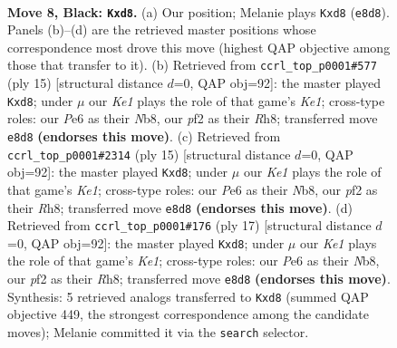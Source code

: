 \documentclass[11pt]{article}
\begin{document}
\begin{figure}[p]\centering
\begin{subfigure}{0.46\textwidth}\centering
\resizebox{\linewidth}{!}{%
\newchessgame
\chessboard[
  setfen={rnbQk2r/1p3ppp/p3pn2/2b5/2B5/4PN2/PP3PPP/RNB2RK1 b kq - 0 8},
  showmover=false,
  pgfstyle=straightmove, color=movearrow, markmove={e8-d8}
]}
\caption{}
\end{subfigure}\hfill
\begin{subfigure}{0.46\textwidth}\centering
\resizebox{\linewidth}{!}{%
\newchessgame
\chessboard[
  setfen={rnbQk2r/1p3ppp/p3pn2/2b5/2B5/4PN2/PP3PPP/RNB2RK1 b kq - 0 8},
  showmover=false,
  pgfstyle=straightmove, color=movearrow, markmove={e8-d8}
]}
\caption{}
\end{subfigure}
\\[4pt]
\begin{subfigure}{0.46\textwidth}\centering
\resizebox{\linewidth}{!}{%
\newchessgame
\chessboard[
  setfen={rnbQk2r/1p3ppp/p3pn2/2b5/2B5/4PN2/PP3PPP/RNB2RK1 b kq - 0 8},
  showmover=false,
  pgfstyle=straightmove, color=movearrow, markmove={e8-d8}
]}
\caption{}
\end{subfigure}\hfill
\begin{subfigure}{0.46\textwidth}\centering
\resizebox{\linewidth}{!}{%
\newchessgame
\chessboard[
  setfen={rnbQk2r/1p3ppp/p3pn2/2b5/2B5/4PN2/PP3PPP/RNB2RK1 b kq - 0 9},
  showmover=false,
  pgfstyle=straightmove, color=movearrow, markmove={e8-d8}
]}
\caption{}
\end{subfigure}
\caption{\textbf{Move 8, Black: \texttt{Kxd8}.} (a) Our position; Melanie plays \texttt{Kxd8} (\texttt{e8d8}). Panels (b)--(d) are the retrieved master positions whose correspondence most drove this move (highest QAP objective among those that transfer to it). (b) Retrieved from \texttt{ccrl\_top\_p0001\#577} (ply 15) [structural distance $d$=0, QAP obj=92]: the master played \texttt{Kxd8}; under $\mu$ our \emph{Ke1} plays the role of that game's \emph{Ke1}; cross-type roles: our \emph{P}e6 as their \emph{N}b8, our \emph{p}f2 as their \emph{R}h8; transferred move \texttt{e8d8} \textbf{(endorses this move)}. (c) Retrieved from \texttt{ccrl\_top\_p0001\#2314} (ply 15) [structural distance $d$=0, QAP obj=92]: the master played \texttt{Kxd8}; under $\mu$ our \emph{Ke1} plays the role of that game's \emph{Ke1}; cross-type roles: our \emph{P}e6 as their \emph{N}b8, our \emph{p}f2 as their \emph{R}h8; transferred move \texttt{e8d8} \textbf{(endorses this move)}. (d) Retrieved from \texttt{ccrl\_top\_p0001\#176} (ply 17) [structural distance $d$=0, QAP obj=92]: the master played \texttt{Kxd8}; under $\mu$ our \emph{Ke1} plays the role of that game's \emph{Ke1}; cross-type roles: our \emph{P}e6 as their \emph{N}b8, our \emph{p}f2 as their \emph{R}h8; transferred move \texttt{e8d8} \textbf{(endorses this move)}. Synthesis: 5 retrieved analogs transferred to \texttt{Kxd8} (summed QAP objective 449, the strongest correspondence among the candidate moves); Melanie committed it via the \texttt{search} selector.}
\label{fig:thought-m15}
\end{figure}
\end{document}
